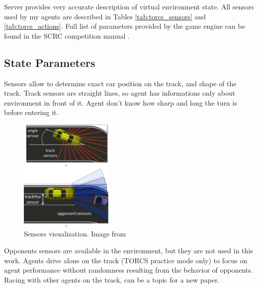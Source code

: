 \documentclass[declaration,shortabstract,english,inz]{iithesis}
\begin{document}
Server provides very accurate description of virtual environment state.
All sensors used by my agents are described in Tables \ref{tab:torcs_sensors} and \ref{tab:torcs_actions}.
Full list of parameters provided by the game engine can be found in the SCRC competition manual \cite{scrc_manual}.

\subsection{State Parameters}

Sensors allow to determine exact car position on the track, and shape of the track.
Track sensors are straight lines, so agent has informations only about environment in front of it.
Agent don't know how sharp and long the turn is before entering it.

\begin{figure}[h]
    \centering
    \includegraphics[width=0.4\textwidth]{img/sensors.png}
    \caption{Sensors visualization. Image from \cite{SCRC}}
    \label{fig:sensors_img}
\end{figure}


Opponents sensors are available in the environment, but they are not used in this work.
Agents drive alone on the track (TORCS practice mode only) to focus on agent performance without randomness resulting from the behavior of opponents.
Racing with other agents on the track, can be a topic for a new paper. 
\end{document}
